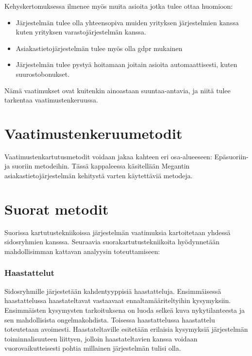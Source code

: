     Kehyskertomuksessa ilmenee myös muita asioita jotka tulee ottaa huomioon:
    
    \begin{itemize}
        \item Järjestelmän tulee olla yhteensopiva muiden yrityksen järjestelmien kanssa kuten yrityksen varastojärjestelmän kanssa.
	\item Asiakastietojärjestelmän tulee myös olla \gls{gdpr} mukainen
        \item Järjestelmän tulee pystyä hoitamaan joitain asioita automaattisesti, kuten suurostobonukset.
    \end{itemize}

    Nämä vaatimukset ovat kuitenkin ainoastaan suuntaa-antavia, ja niitä tulee tarkentaa vaatimustenkeruussa. 


\section{Vaatimustenkeruumetodit}

    Vaatimustenkartutusmetodit voidaan jakaa kahteen eri osa-alueeseen: Epäsuoriin- ja suoriin metodeihin.
    Tässä kappaleessa käsitellään Megantin asiakastietojärjestelmän kehitystä varten käytettäviä metodeja.


    \section*{Suorat metodit}

        Suorissa kartutustekniikoissa järjestelmän vaatimuksia kartoitetaan yhdessä sidosryhmien kansssa.
        Seuraavia suorakartutustekniikoita hyödynnetään mahdollisimman kattavan analyysin toteuttamiseen:

        \subsubsection*{Haastattelut}

            Sidosryhmille järjestetään kahdentyyppisiä haastatteluja. Ensimmäisessä haastattelussa haastateltavat vastaavaat ennaltamääriteltyihin kysymyksiin. 
            Ensimmäisten kysymysten tarkoituksena on luoda selkeä kuva nykytilanteesta ja sen mahdollisista ongelmakohdista. Toisessa haastattelussa haastattelu toteutetaan avoimesti. Haastateltaville esitetään erilaisia kysymyksiä järjestelmän toiminnalisuuteen liittyen, jolloin haastateltavien kanssa voidaan vuorovaikutteisesti pohtia millainen järjestelmän tulisi olla.

